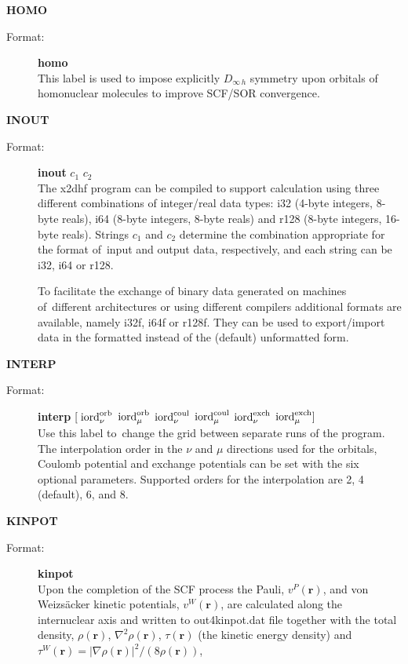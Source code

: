 \documentclass[10pt,a4paper]{article}
\newcommand{\fb}[1]{\textbf{#1}}
\begin{document}
\begin{description}
\item \textbf{HOMO}
\begin{description}
\item[Format:] \textbf{homo}  \\
  This label is used to impose explicitly $D_{\infty\,h}$ symmetry upon
  orbitals of homonuclear molecules to improve SCF/SOR convergence.
\end{description}

\item \textbf{INOUT}
\begin{description}
\item[Format:] \textbf{inout} $c_1$ $c_2$\\ The x2dhf program can be
  compiled to support calculation using three different combinations of
  integer/real data types: i32 (4-byte integers, 8-byte reals), i64 (8-byte
  integers, 8-byte reals) and r128 (8-byte integers, 16-byte reals).
  Strings $c_1$ and $c_2$ determine the combination appropriate for the
  format of~input and output data, respectively, and each string can be
  i32, i64 or r128.

  To facilitate the exchange of binary data generated on machines
  of~different architectures or using different compilers additional
  formats are available, namely i32f, i64f or r128f. They can be used to
  export/import data in the formatted instead of the (default) unformatted form.
\end{description}


\item \textbf{INTERP}
\begin{description}
\item[Format:] \textbf{interp} $[\; {\rm iord}_\nu^{\rm orb}$ ${\rm
    iord}_\mu^{\rm orb}$ ${\rm iord}_\nu^{\rm coul}$ ${\rm
    iord}_\mu^{\rm coul}$ ${\rm iord}_\nu^{\rm exch}$ ${\rm
    iord}_\mu^{\rm exch} ]$\\ Use this label to~change the grid
  between separate runs of the program. The interpolation order in the
  $\nu$ and $\mu$ directions used for the orbitals, Coulomb potential
  and exchange potentials can be set with the six optional
  parameters. Supported orders for the interpolation are 2, 4
  (default), 6, and 8.
\end{description}

\item \textbf{KINPOT}
\begin{description}
\item[Format:] \textbf{kinpot}  \\
  Upon the completion of the SCF process the Pauli, $v^P(\fb{r})$, and
  von Weizs\"acker kinetic potentials, $v^W(\fb{r})$, are calculated
  along the internuclear axis and written to out4kinpot.dat file together
  with the total density, $\rho(\fb{r})$, $\nabla^2 \rho(\fb{r})$,
  $\tau(\fb{r})$ (the kinetic energy density) and 
  $\tau^W(\fb{r})=|\nabla \rho(\fb{r})|^2/(8\rho(\fb{r}))$,
\end{description}


\end{description}
\end{document}
